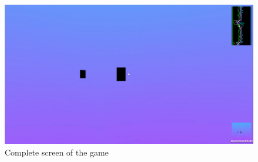 \begin{figure}[h]
  \centering
		\includegraphics[width=.8\textwidth]{img/uiComplete.png}
  \caption{Complete screen of the game}
  \label{fig:uicomp}
\end{figure}

